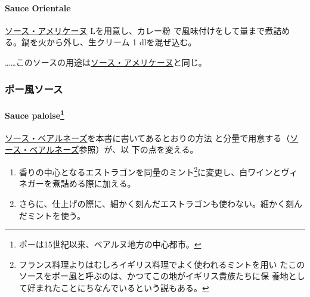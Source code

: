 \begin{recette}
\hypertarget{sauce-orientale}{%
\paragraph{Sauce Orientale}\label{sauce-orientale}}


\protect\hyperlink{sauce-americaine}{ソース・アメリケーヌ}\undemi{}
Lを用意し、カレー粉
で風味付けをして\deuxtiers{}量まで煮詰める。鍋を火から外し、生クリーム
1\undemi{} dlを混ぜ込む。

\ldots{}\ldots{}このソースの用途は\protect\hyperlink{sauce-americaine}{ソース・アメリケーヌ}と同じ。

\maeaki

\hypertarget{ux30ddux30fcux98a8ux30bdux30fcux30b9}{%
\subsubsection{ポー風ソース}\label{ux30ddux30fcux98a8ux30bdux30fcux30b9}}

\hypertarget{sauce-paloise110}{%
\paragraph[Sauce paloise]{\texorpdfstring{Sauce paloise\footnote{ポーは15世紀以来、ベアルヌ地方の中心都市。}}{Sauce paloise}}\label{sauce-paloise110}}


\protect\hyperlink{sauce-bearnaise}{ソース・ベアルネーズ}を本書に書いてあるとおりの方法
と分量で用意する（\protect\hyperlink{sauce-bearnaise}{ソース・ベアルネーズ}参照）が、以
下の点を変える。

\begin{enumerate}
\def\labelenumi{\arabic{enumi}.}
\item
  香りの中心となるエストラゴンを同量のミント\footnote{フランス料理よりはむしろイギリス料理でよく使われるミントを用い
    たこのソースをポー風と呼ぶのは、かつてこの地がイギリス貴族たちに保
    養地として好まれたことにちなんでいるという説もある。}に変更し、白ワインとヴィネガーを煮詰める際に加える。
\item
  さらに、仕上げの際に、細かく刻んだエストラゴンも使わない。細かく刻んだミントを使う。
\end{enumerate}


\end{recette}

